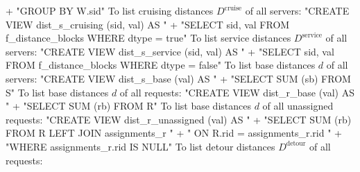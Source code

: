   + "GROUP BY W.sid"
\nwendcode{}\nwdocspar
To list cruising distances $D^\textrm{cruise}$ of all servers:
\nwenddocs{}\endmoddef{}
"CREATE VIEW dist_s_cruising (sid, val) AS "
  + "SELECT sid, val FROM f_distance_blocks WHERE dtype = true"
\nwendcode{}\nwdocspar
To list service distances $D^\textrm{service}$ of all servers:
\nwenddocs{}\endmoddef{}
"CREATE VIEW dist_s_service (sid, val) AS "
  + "SELECT sid, val FROM f_distance_blocks WHERE dtype = false"
\nwendcode{}\nwdocspar
To list base distances $d$ of all servers:
\nwenddocs{}\endmoddef{}
"CREATE VIEW dist_s_base (val) AS "
  + "SELECT SUM (sb) FROM S"
\nwendcode{}\nwdocspar
To list base distances $d$ of all requests:
\nwenddocs{}\endmoddef{}
"CREATE VIEW dist_r_base (val) AS "
  + "SELECT SUM (rb) FROM R"
\nwendcode{}\nwdocspar
To list base distances $d$ of all unassigned requests:
\nwenddocs{}\endmoddef{}
"CREATE VIEW dist_r_unassigned (val) AS "
  + "SELECT SUM (rb) FROM R LEFT JOIN assignments_r "
  + "  ON R.rid = assignments_r.rid "
  + "WHERE assignments_r.rid IS NULL"
\nwendcode{}\nwdocspar
To list detour distances $D^\textrm{detour}$ of all requests:
